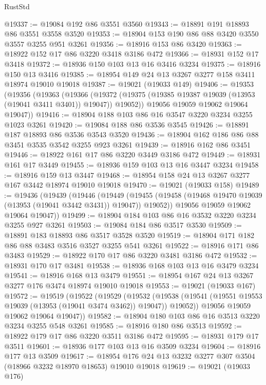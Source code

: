 \begin{lexlean}{RustStd}
\begin{coremodule}
@19337 := @19084 @192 @86 @3551 @3560
@19343 := @18891 @191 @18893 @86 @3551 @3558 @3520
@19353 := @18904 @153 @190 @86 @88 @3420 @3550 @3557 @3255 @951 @3261
@19356 := @18916 @153 @86 @3420
@19363 := @18922 @152 @17 @86 @3220 @3418 @3186 @472
@19366 := @18931 @152 @17 @3418
@19372 := @18936 @150 @103 @13 @16 @3416 @3234
@19375 := @18916 @150 @13 @3416
@19385 := @18954 @149 @24 @13 @3267 @3277 @158 @3411 @18974 @19010 @19018
@19387 := @19021 (@19033 @149)
@19406 := @19353
    (@19356
      (@19363
        (@19366
          (@19372 (@19375 (@19385 @19387 @19039 (@13953 (@19041 @3411 @3401)) @19047)) @19052))
        @19056
        @19059
        @19062
        @19064
        @19047))
@19416 := @18904 @188 @103 @86 @16 @3547 @3220 @3234 @3255 @1023 @3261
@19420 := @19084 @188 @86 @3536 @3545
@19426 := @18891 @187 @18893 @86 @3536 @3543 @3520
@19436 := @18904 @162 @186 @86 @88 @3451 @3535 @3542 @3255 @923 @3261
@19439 := @18916 @162 @86 @3451
@19446 := @18922 @161 @17 @86 @3220 @3449 @3186 @472
@19449 := @18931 @161 @17 @3449
@19455 := @18936 @159 @103 @13 @16 @3447 @3234
@19458 := @18916 @159 @13 @3447
@19468 := @18954 @158 @24 @13 @3267 @3277 @167 @3442 @18974 @19010 @19018
@19470 := @19021 (@19033 @158)
@19489 := @19436
    (@19439
      (@19446
        (@19449
          (@19455 (@19458 (@19468 @19470 @19039 (@13953 (@19041 @3442 @3431)) @19047)) @19052))
        @19056
        @19059
        @19062
        @19064
        @19047))
@19499 := @18904 @184 @103 @86 @16 @3532 @3220 @3234 @3255 @927 @3261
@19503 := @19084 @184 @86 @3517 @3530
@19509 := @18891 @183 @18893 @86 @3517 @3528 @3520
@19519 := @18904 @171 @182 @86 @88 @3483 @3516 @3527 @3255 @541 @3261
@19522 := @18916 @171 @86 @3483
@19529 := @18922 @170 @17 @86 @3220 @3481 @3186 @472
@19532 := @18931 @170 @17 @3481
@19538 := @18936 @168 @103 @13 @16 @3479 @3234
@19541 := @18916 @168 @13 @3479
@19551 := @18954 @167 @24 @13 @3267 @3277 @176 @3474 @18974 @19010 @19018
@19553 := @19021 (@19033 @167)
@19572 := @19519
    (@19522
      (@19529
        (@19532
          (@19538 (@19541 (@19551 @19553 @19039 (@13953 (@19041 @3474 @3462)) @19047)) @19052))
        @19056
        @19059
        @19062
        @19064
        @19047))
@19582 := @18904 @180 @103 @86 @16 @3513 @3220 @3234 @3255 @548 @3261
@19585 := @18916 @180 @86 @3513
@19592 := @18922 @179 @17 @86 @3220 @3511 @3186 @472
@19595 := @18931 @179 @17 @3511
@19601 := @18936 @177 @103 @13 @16 @3509 @3234
@19604 := @18916 @177 @13 @3509
@19617 := @18954 @176 @24 @13 @3232 @3277 @307 @3504 (@18966 @3232 @18970 @18653) @19010 @19018
@19619 := @19021 (@19033 @176)

\end{coremodule}
\end{lexlean}
